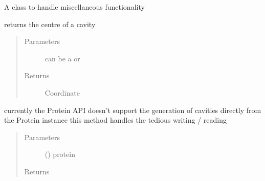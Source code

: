 \documentclass[letterpaper,10pt,english]{sphinxmanual}
\begin{document}
\begin{fulllineitems}
\label{\detokenize{hs_utilities_api:hotspots.hs_utilities.Helper}}
A class to handle miscellaneous functionality

\begin{fulllineitems}
\label{\detokenize{hs_utilities_api:hotspots.hs_utilities.Helper.cavity_centroid}}
returns the centre of a cavity
\begin{quote}\begin{description}
\item[{Parameters}] \leavevmode
{} \textendash{} can be a  or

\item[{Returns}] \leavevmode
Coordinate

\end{description}\end{quote}

\end{fulllineitems}


\begin{fulllineitems}
\label{\detokenize{hs_utilities_api:hotspots.hs_utilities.Helper.cavity_from_protein}}
currently the Protein API doesn’t support the generation of cavities directly from the Protein instance
this method handles the tedious writing / reading
\begin{quote}\begin{description}
\item[{Parameters}] \leavevmode
{} () \textendash{} protein

\item[{Returns}] \leavevmode
{}


\end{description}
\end{quote}
\end{fulllineitems}
\end{fulllineitems}
\end{document}
